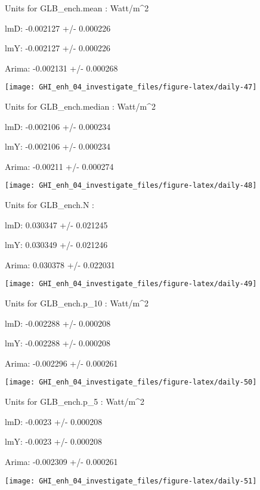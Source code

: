 \documentclass[
  10pt,
  a4paper,oneside]{article}
\begin{document}
Units for GLB\_ench.mean : Watt/m\^{}2

lmD: -0.002127 +/- 0.000226

lmY: -0.002127 +/- 0.000226

Arima: -0.002131 +/- 0.000268

\begin{center}\texttt{[image: GHI\_enh\_04\_investigate\_files/figure-latex/daily-47]} \end{center}

Units for GLB\_ench.median : Watt/m\^{}2

lmD: -0.002106 +/- 0.000234

lmY: -0.002106 +/- 0.000234

Arima: -0.00211 +/- 0.000274

\begin{center}\texttt{[image: GHI\_enh\_04\_investigate\_files/figure-latex/daily-48]} \end{center}

Units for GLB\_ench.N :

lmD: 0.030347 +/- 0.021245

lmY: 0.030349 +/- 0.021246

Arima: 0.030378 +/- 0.022031

\begin{center}\texttt{[image: GHI\_enh\_04\_investigate\_files/figure-latex/daily-49]} \end{center}

Units for GLB\_ench.p\_10 : Watt/m\^{}2

lmD: -0.002288 +/- 0.000208

lmY: -0.002288 +/- 0.000208

Arima: -0.002296 +/- 0.000261

\begin{center}\texttt{[image: GHI\_enh\_04\_investigate\_files/figure-latex/daily-50]} \end{center}

Units for GLB\_ench.p\_5 : Watt/m\^{}2

lmD: -0.0023 +/- 0.000208

lmY: -0.0023 +/- 0.000208

Arima: -0.002309 +/- 0.000261

\begin{center}\texttt{[image: GHI\_enh\_04\_investigate\_files/figure-latex/daily-51]} \end{center}
\end{document}
